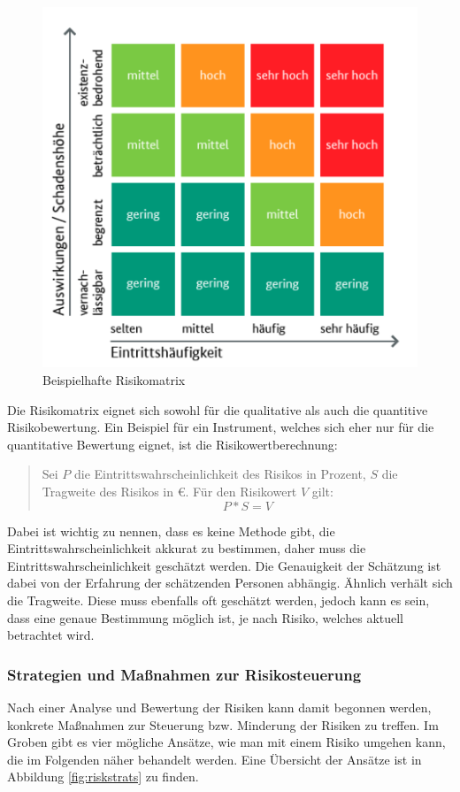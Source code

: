 \documentclass[ThesisDJ.tex]{subfiles}
\begin{document}
\begin{figure}
    \centering
    \includegraphics[width=0.6\linewidth]{risikomatrix.png}
    \caption{Beispielhafte Risikomatrix}
    \label{fig:riskmatrix}
\end{figure}

Die Risikomatrix eignet sich sowohl für die qualitative als auch die quantitive Risikobewertung. Ein Beispiel für ein Instrument, welches sich eher nur für die quantitative Bewertung eignet, ist die Risikowertberechnung:

\begin{quote}
    Sei $P$ die Eintrittswahrscheinlichkeit des Risikos in Prozent, $S$ die Tragweite des Risikos in €. Für den Risikowert $V$ gilt:
    \[ P * S = V \]  
\end{quote}

Dabei ist wichtig zu nennen, dass es keine Methode gibt, die Eintrittswahrscheinlichkeit akkurat zu bestimmen, daher muss die Eintrittswahrscheinlichkeit geschätzt werden. Die Genauigkeit der Schätzung ist dabei von der Erfahrung der schätzenden Personen abhängig. Ähnlich verhält sich die Tragweite. Diese muss ebenfalls oft geschätzt werden, jedoch kann es sein, dass eine genaue Bestimmung möglich ist, je nach Risiko, welches aktuell betrachtet wird.

\subsubsection{Strategien und Maßnahmen zur Risikosteuerung}
Nach einer Analyse und Bewertung der Risiken kann damit begonnen werden, konkrete Maßnahmen zur Steuerung bzw. Minderung der Risiken zu treffen. Im Groben gibt es vier mögliche Ansätze, wie man mit einem Risiko umgehen kann, die im Folgenden näher behandelt werden. Eine Übersicht der Ansätze ist in Abbildung \ref{fig:riskstrats}\cite[S.~25]{cicek2022risikomanagement} zu finden.
\end{document}

